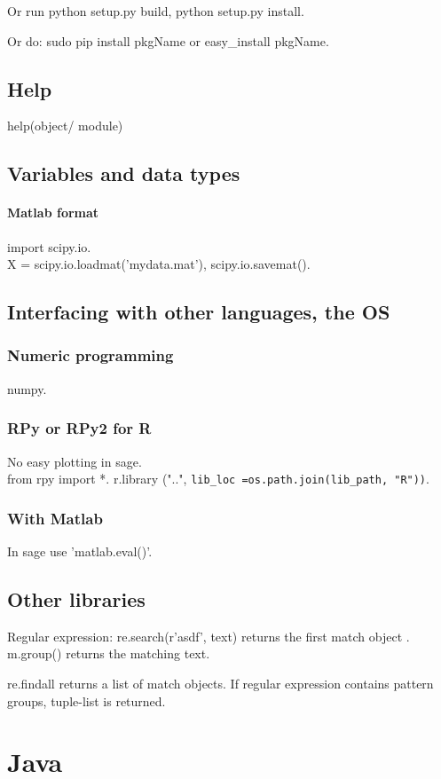 \documentclass[oneside, article]{memoir}
\begin{document}
Or run python setup.py build, python setup.py install.

Or do: sudo pip install pkgName or easy\_install pkgName.

\section{Help}
help(object/ module)

\section{Variables and data types}
\subsubsection{Matlab format}
import scipy.io. \\
X = scipy.io.loadmat('mydata.mat'), scipy.io.savemat().

\section{Interfacing with other languages, the OS}
\subsection{Numeric programming}
numpy.

\subsection{RPy or RPy2 for R}
No easy plotting in sage.\\
 from rpy import *. r.library ("..",  \verb'lib_loc =os.path.join(lib_path, "R"))'.

\subsection{With Matlab}
In sage use 'matlab.eval()'.

\section{Other libraries}
Regular expression: re.search(r'asdf', text) returns the first match object . m.group() returns the matching text.

re.findall returns a list of match objects. If regular expression contains pattern groups, tuple-list is returned.

\chapter{Java}
\end{document}

